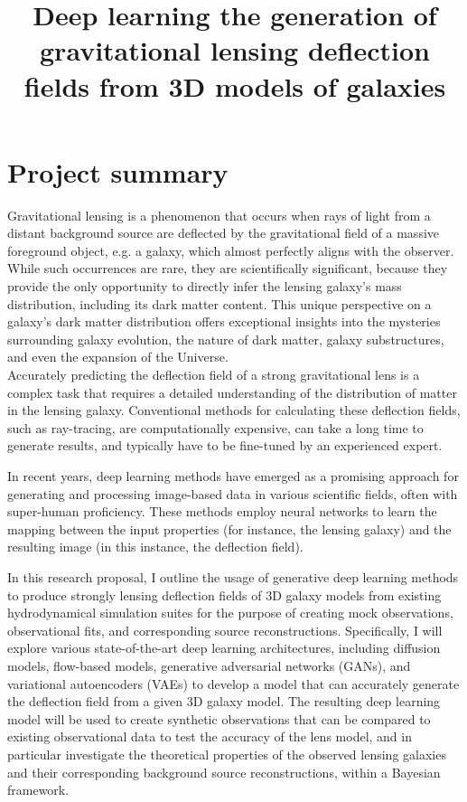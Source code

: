 \documentclass[a4paper,10pt]{article}
\date{}
\title{Deep learning the generation of gravitational lensing deflection fields from 3D models of galaxies}
\begin{document}
\maketitle
\vspace{-0.8in}
\section*{Project summary}
\label{sec:org95c2847}

Gravitational lensing is a phenomenon that occurs when rays of light
from a distant background source are deflected by the gravitational
field of a massive foreground object, e.g. a galaxy, which almost
perfectly aligns with the observer. While such occurrences are rare,
they are scientifically significant, because they provide the only
opportunity to directly infer the lensing galaxy's mass distribution,
including its dark matter content.  This unique perspective on a
galaxy's dark matter distribution offers exceptional insights into the
mysteries surrounding galaxy evolution, the nature of dark matter,
galaxy substructures, and even the expansion of the Universe. \\[0pt]
Accurately predicting the deflection field of a strong gravitational
lens is a complex task that requires a detailed understanding of the
distribution of matter in the lensing galaxy. Conventional methods for
calculating these deflection fields, such as ray-tracing, are
computationally expensive, can take a long time to generate results,
and typically have to be fine-tuned by an experienced expert.

In recent years, deep learning methods have emerged as a promising
approach for generating and processing image-based data in various
scientific fields, often with super-human proficiency. These methods
employ neural networks to learn the mapping between the input
properties (for instance, the lensing galaxy) and the resulting image
(in this instance, the deflection field).

In this research proposal, I outline the usage of generative deep
learning methods to produce strongly lensing deflection fields of 3D
galaxy models from existing hydrodynamical simulation suites for the
purpose of creating mock observations, observational fits, and
corresponding source reconstructions. Specifically, I will explore
various state-of-the-art deep learning architectures, including
diffusion models, flow-based models, generative adversarial networks
(GANs), and variational autoencoders (VAEs) to develop a model that
can accurately generate the deflection field from a given 3D galaxy
model. The resulting deep learning model will be used to create
synthetic observations that can be compared to existing observational
data to test the accuracy of the lens model, and in particular
investigate the theoretical properties of the observed lensing
galaxies and their corresponding background source reconstructions,
within a Bayesian framework.
\end{document}
